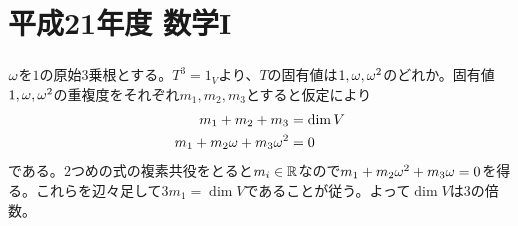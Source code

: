 \section{平成21年度 数学I}

\subsubsection{}%
\begin{sol}
  ${\omega}$を$1$の原始$3$乗根とする。$T^3 = 1_V$より、$T$の固有値は$1, {\omega}, {\omega}^2$のどれか。固有値$1, {\omega}, {\omega}^2$の重複度をそれぞれ$m_1, m_2,m_3$とすると仮定により
  \begin{align*}
    m_1 + m_2 +m_3 &= \dim V \\
    m_1 + m_2 {\omega} +m_3 {\omega}^2 &= 0
  \end{align*}
  である。$2$つめの式の複素共役をとると$m_i \in {\mathbb R}$なので$m_1 + m_2 {\omega}^2 +m_3 {\omega} = 0$を得る。これらを辺々足して$3m_1 = \dim V$であることが従う。よって$\dim V$は$3$の倍数。
\end{sol}

\newpage


